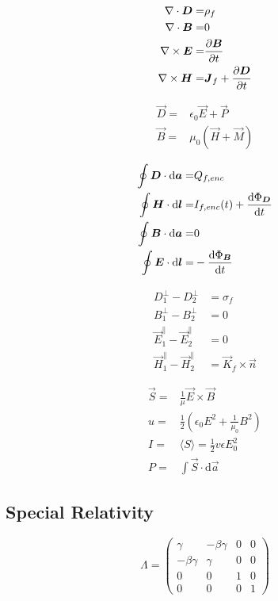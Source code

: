 \begin{align*}
    \nabla\cdot\boldsymbol{D} =& \rho_{f} \\
    \nabla\cdot\boldsymbol{B} =& 0 \\
    \nabla \times \boldsymbol{E} =& \frac{\partial \boldsymbol{B}}{\partial t} \\
    \nabla \times \boldsymbol{H} =& \boldsymbol{J}_{f} + \frac{\partial \boldsymbol{D}}{\partial t}
\end{align*}

\begin{align*}
    \vec{D} =& \epsilon_{0}\vec{E} + \vec{P} \\
    \vec{B} =& \mu_{0}(\vec{H} + \vec{M})
\end{align*}

\begin{align*}
    \oint \boldsymbol{D} \cdot \mathrm{d}\boldsymbol{a} =& Q_{f,enc} \\
    \oint \boldsymbol{H} \cdot \mathrm{d}\boldsymbol{l} =& I_{f,enc}(t) + \frac{\mathrm{d} \Phi_{\boldsymbol{D}}}{\mathrm{d} t} \\
    \oint \boldsymbol{B} \cdot \mathrm{d}\boldsymbol{a} =& 0\\
    \oint \boldsymbol{E} \cdot \mathrm{d}\boldsymbol{l} =& - \frac{\mathrm{d} \Phi_{\boldsymbol{B}}}{\mathrm{d} t}
\end{align*}

\begin{align*}
    D_{1}^{\perp} - D_{2}^{\perp} &= \sigma_{f} \\
    B_{1}^{\perp} - B_{2}^{\perp} &= 0 \\
    \vec{E}_{1}^{\parallel} - \vec{E}_{2}^{\parallel} &= 0 \\
    \vec{H}_{1}^{\parallel} - \vec{H}_{2}^{\parallel} &= \vec{K}_f \times \hat{\vec{n}}
\end{align*}

\begin{align*}
    \vec{S} =& \frac{1}{\mu} \vec{E} \times \vec{B} \\
    u =& \frac{1}{2} \left( \epsilon_0 E^{2} + \frac{1}{\mu_0} B^{2} \right) \\
    I =& \langle S \rangle = \frac{1}{2} v\epsilon E_{0}^{2} \\
    P =& \int \vec{S} \cdot \mathrm{d}\vec{a}
\end{align*}

\subsection{Special Relativity}
\begin{equation*}
    \Lambda =
    \begin{pmatrix}
        \gamma & -\beta\gamma & 0 & 0 \\
        -\beta\gamma & \gamma & 0 & 0 \\
        0 & 0 & 1 & 0 \\
        0 & 0 & 0 & 1
    \end{pmatrix}
\end{equation*}


